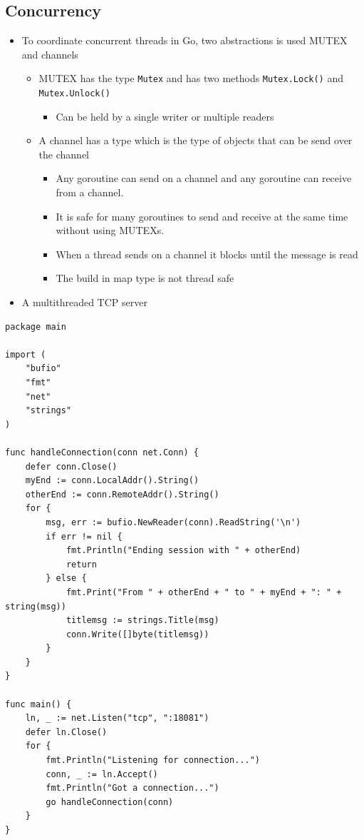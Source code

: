 \documentclass[11pt]{article}
\begin{document}
\subsection{Concurrency}
\label{sec:org2f89eab}
\begin{itemize}
\item To coordinate concurrent threads in Go, two abstractions is used MUTEX and channels
\begin{itemize}
\item MUTEX has the type \texttt{Mutex} and has two methods \texttt{Mutex.Lock()} and \texttt{Mutex.Unlock()}
\begin{itemize}
\item Can be held by a single writer or multiple readers
\end{itemize}
\item A channel has a type which is the type of objects that can be send over the channel
\begin{itemize}
\item Any goroutine can send on a channel and any goroutine can receive from a channel.
\item It is safe for many goroutines to send and receive at the same time without using MUTEXs.
\item When a  thread sends on a channel it blocks until the message is read
\item The build in map type is not thread safe
\end{itemize}
\end{itemize}

\item A multithreaded TCP server
\end{itemize}
\begin{verbatim}
package main

import (
	"bufio"
	"fmt"
	"net"
	"strings"
)

func handleConnection(conn net.Conn) {
	defer conn.Close()
	myEnd := conn.LocalAddr().String()
	otherEnd := conn.RemoteAddr().String()
	for {
		msg, err := bufio.NewReader(conn).ReadString('\n')
		if err != nil {
			fmt.Println("Ending session with " + otherEnd)
			return
		} else {
			fmt.Print("From " + otherEnd + " to " + myEnd + ": " + string(msg))
			titlemsg := strings.Title(msg)
			conn.Write([]byte(titlemsg))
		}
	}
}

func main() {
	ln, _ := net.Listen("tcp", ":18081")
	defer ln.Close()
	for {
		fmt.Println("Listening for connection...")
		conn, _ := ln.Accept()
		fmt.Println("Got a connection...")
		go handleConnection(conn)
	}
}
\end{verbatim}
\end{document}
